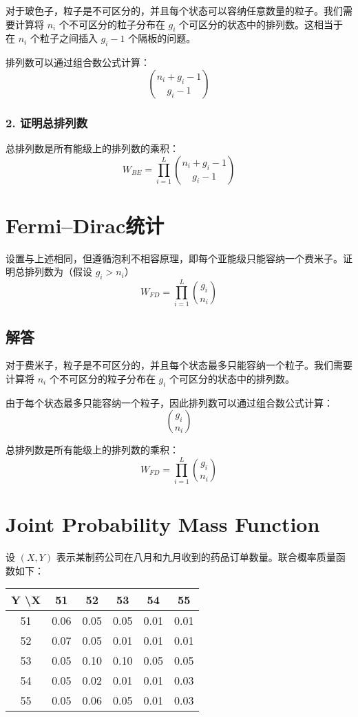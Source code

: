 \documentclass[UTF8]{report}
\theoremstyle{MyLineTheoremStyle} %
\theoremstyle{MyBlockTheoremStyle} %
\theoremstyle{MySubsubsectionStyle} %
\begin{document}
对于玻色子，粒子是不可区分的，并且每个状态可以容纳任意数量的粒子。我们需要计算将 \(n_i\) 个不可区分的粒子分布在 \(g_i\) 个可区分的状态中的排列数。这相当于在 \(n_i\) 个粒子之间插入 \(g_i - 1\) 个隔板的问题。

排列数可以通过组合数公式计算：
\[
\binom{n_i + g_i - 1}{g_i - 1}
\]

\subsubsection*{2. 证明总排列数}

总排列数是所有能级上的排列数的乘积：
\[
W_{BE} = \prod_{i=1}^{L} \binom{n_i + g_i - 1}{g_i - 1}
\]

\section{Fermi–Dirac统计}

设置与上述相同，但遵循泡利不相容原理，即每个亚能级只能容纳一个费米子。证明总排列数为（假设 \(g_i > n_i\)）
\[
W_{FD} = \prod_{i=1}^{L} \binom{g_i}{n_i}
\]

\subsection*{解答}

对于费米子，粒子是不可区分的，并且每个状态最多只能容纳一个粒子。我们需要计算将 \(n_i\) 个不可区分的粒子分布在 \(g_i\) 个可区分的状态中的排列数。

由于每个状态最多只能容纳一个粒子，因此排列数可以通过组合数公式计算：
\[
\binom{g_i}{n_i}
\]

总排列数是所有能级上的排列数的乘积：
\[
W_{FD} = \prod_{i=1}^{L} \binom{g_i}{n_i}
\]

\section{Joint Probability Mass Function}

设 \((X, Y)\) 表示某制药公司在八月和九月收到的药品订单数量。联合概率质量函数如下：

\begin{center}
\begin{tabular}{c|ccccc}
Y \textbackslash X & 51 & 52 & 53 & 54 & 55 \\
\hline
51 & 0.06 & 0.05 & 0.05 & 0.01 & 0.01 \\
52 & 0.07 & 0.05 & 0.01 & 0.01 & 0.01 \\
53 & 0.05 & 0.10 & 0.10 & 0.05 & 0.05 \\
54 & 0.05 & 0.02 & 0.01 & 0.01 & 0.03 \\
55 & 0.05 & 0.06 & 0.05 & 0.01 & 0.03 \\
\end{tabular}
\end{center}
\end{document}
